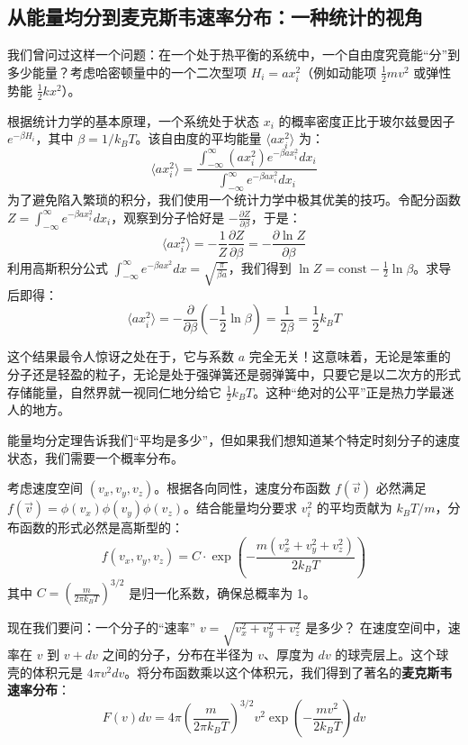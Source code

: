 \documentclass[UTF8]{ctexbook}
\begin{document}
\subsection{从能量均分到麦克斯韦速率分布：一种统计的视角}


我们曾问过这样一个问题：在一个处于热平衡的系统中，一个自由度究竟能“分”到多少能量？考虑哈密顿量中的一个二次型项 $H_i = ax_i^2$（例如动能项 $\frac{1}{2}mv^2$ 或弹性势能 $\frac{1}{2}kx^2$）。

根据统计力学的基本原理，一个系统处于状态 $x_i$ 的概率密度正比于玻尔兹曼因子 $e^{-\beta H_i}$，其中 $\beta = 1/k_BT$。该自由度的平均能量 $\langle ax_i^2 \rangle$ 为：
\[
\langle ax_i^2 \rangle = \frac{\int_{-\infty}^{\infty} (ax_i^2) e^{-\beta ax_i^2} dx_i}{\int_{-\infty}^{\infty} e^{-\beta ax_i^2} dx_i}
\]
为了避免陷入繁琐的积分，我们使用一个统计力学中极其优美的技巧。令配分函数 $Z = \int_{-\infty}^{\infty} e^{-\beta ax_i^2} dx_i$，观察到分子恰好是 $-\frac{\partial Z}{\partial \beta}$，于是：
\[
\langle ax_i^2 \rangle = -\frac{1}{Z} \frac{\partial Z}{\partial \beta} = -\frac{\partial \ln Z}{\partial \beta}
\]
利用高斯积分公式 $\int_{-\infty}^{\infty} e^{-\beta ax^2} dx = \sqrt{\frac{\pi}{\beta a}}$，我们得到 $\ln Z = \text{const} - \frac{1}{2} \ln \beta$。求导后即得：
\[
\langle ax_i^2 \rangle = -\frac{\partial}{\partial \beta} \left( -\frac{1}{2} \ln \beta \right) = \frac{1}{2\beta} = \frac{1}{2}k_BT
\]

这个结果最令人惊讶之处在于，它与系数 $a$ 完全无关！这意味着，无论是笨重的分子还是轻盈的粒子，无论是处于强弹簧还是弱弹簧中，只要它是以二次方的形式存储能量，自然界就一视同仁地分给它 $\frac{1}{2}k_BT$。这种“绝对的公平”正是热力学最迷人的地方。



能量均分定理告诉我们“平均是多少”，但如果我们想知道某个特定时刻分子的速度状态，我们需要一个概率分布。

考虑速度空间 $(v_x, v_y, v_z)$。根据各向同性，速度分布函数 $f(\vec{v})$ 必然满足 $f(\vec{v}) = \phi(v_x)\phi(v_y)\phi(v_z)$。结合能量均分要求 $v_i^2$ 的平均贡献为 $k_BT/m$，分布函数的形式必然是高斯型的：
\[
f(v_x, v_y, v_z) = C \cdot \exp\left( -\frac{m(v_x^2 + v_y^2 + v_z^2)}{2k_BT} \right)
\]
其中 $C = (\frac{m}{2\pi k_BT})^{3/2}$ 是归一化系数，确保总概率为 1。



现在我们要问：一个分子的“速率” $v = \sqrt{v_x^2 + v_y^2 + v_z^2}$ 是多少？
在速度空间中，速率在 $v$ 到 $v+dv$ 之间的分子，分布在半径为 $v$、厚度为 $dv$ 的球壳层上。这个球壳的体积元是 $4\pi v^2 dv$。将分布函数乘以这个体积元，我们得到了著名的\textbf{麦克斯韦速率分布}：
\[
F(v)dv = 4\pi \left( \frac{m}{2\pi k_BT} \right)^{3/2} v^2 \exp\left( -\frac{mv^2}{2k_BT} \right) dv
\]
\end{document}
